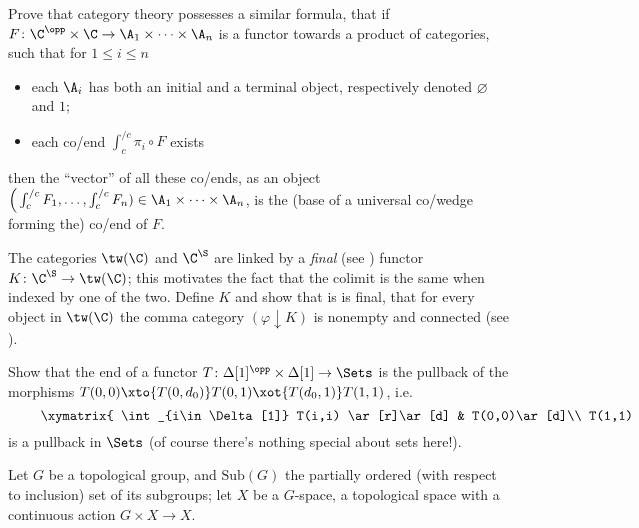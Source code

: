 \begin{exerciseset}
\begin{exercisepoints}
Prove that category theory possesses a similar formula, \ie that if $F\colon \C^\opp\times \C \to \A_1\times \cdots \times \A_n$ is a functor towards a product of categories, such that 
for $1\le i\le n$
\begin{itemize}
\item each $\A_i$ has both an initial and a terminal object, respectively denoted $\varnothing$ and $1$;
\item each co/end $\int_c^{/c} \pi_i\circ F$ exists 
\end{itemize}
then the ``vector'' of all these co/ends, as an object $\Big( \int_c^{/c} F_1 , \dots, \int_c^{/c} F_n) \in \A_1\times\cdots \times \A_n$, is the (base of a universal co/wedge forming the) co/end of $F$. 
\item \label{ex1:theresafinal} The categories $\tw(\C)$ and $\C^\S$ are linked by a \emph{final} (see \cite[\textbf{2.11.1}]{Bor1}) functor $K\colon \C^{\S}\to \tw(\C)$; this motivates the fact that the colimit is the same when indexed by one of the two. Define $K$ and show that is is final, \ie that for every object in $\tw(\C)$ the comma category $(\varphi\downarrow K)$ is nonempty and connected (see \cite[Remark \textbf{7.2.10}, Example \textbf{8.3.9}]{riehl2014categorical}).
\item \label{ispull} Show that the end of a functor $T\colon \Delta[1]^\opp\times \Delta[1]\to \Sets$ is the pullback of the morphisms $T(0,0)\xto{T(0,d_0)} T(0,1)\xot{T(d_0,1)}T(1,1)$, i.e\@. 
\[
	\vcenter{\xymatrix{
     \int_{i\in\Delta[1]} T(i,i) \ar[r]\ar[d] & T(0,0)\ar[d]\\
     T(1,1) \ar[r] & T(0,1)
	}}
\]
is a pullback in $\Sets$ (of course there's nothing special about sets here!).
\item \label{ex1:forgroups} Let $G$ be a topological group, and $\text{Sub}(G)$ the partially ordered (with respect to inclusion) set of its subgroups; let $X$ be a $G$-space, \ie a topological space with a continuous action $G\times X \to X$.


\end{exercisepoints}
\end{exerciseset}
